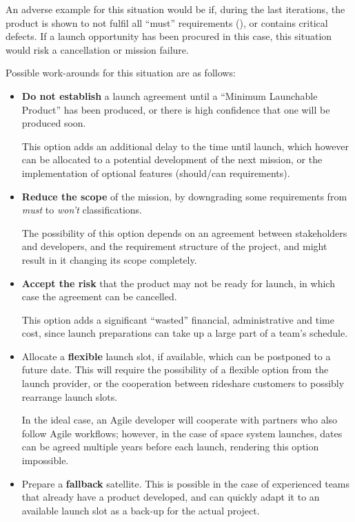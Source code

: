 \documentclass[a4paper,nobib,justified,final]{tufte-book}
\begin{document}
An adverse example for this situation would be if, during the last iterations, the product is shown to not fulfil all ``must'' requirements (), or contains critical defects. If a launch opportunity has been procured in this case, this situation would risk a cancellation or mission failure.

Possible work-arounds for this situation are as follows:
\begin{itemize}
	\item \textbf{Do not establish} a launch agreement until a ``Minimum Launchable Product'' has been produced, or there is high confidence that one will be produced soon.
	
	This option adds an additional delay to the time until launch, which however can be allocated to a potential development of the next mission, or the implementation of optional features (should/can requirements).
	\item \textbf{Reduce the scope} of the mission, by downgrading some requirements from \emph{must} to \emph{won't} classifications.
	
	The possibility of this option depends on an agreement between stakeholders and developers, and the requirement structure of the project, and might result in it changing its scope completely.
	\item \textbf{Accept the risk} that the product may not be ready for launch, in which case the agreement can be cancelled.
	
	This option adds a significant ``wasted'' financial, administrative and time cost, since launch preparations can take up a large part of a team's schedule.
	\item Allocate a \textbf{flexible} launch slot, if available, which can be postponed to a future date. This will require the possibility of a flexible option from the launch provider, or the cooperation between rideshare customers to possibly rearrange launch slots.
	
	In the ideal case, an Agile developer will cooperate with partners who also follow Agile workflows; however, in the case of space system launches, dates can be agreed multiple years before each launch, rendering this option impossible.
	\item Prepare a \textbf{fallback} satellite. 
	This is possible in the case of experienced teams that already have a product developed, and can quickly adapt it to an available launch slot as a back-up for the actual project.
\end{itemize}
\end{document}
